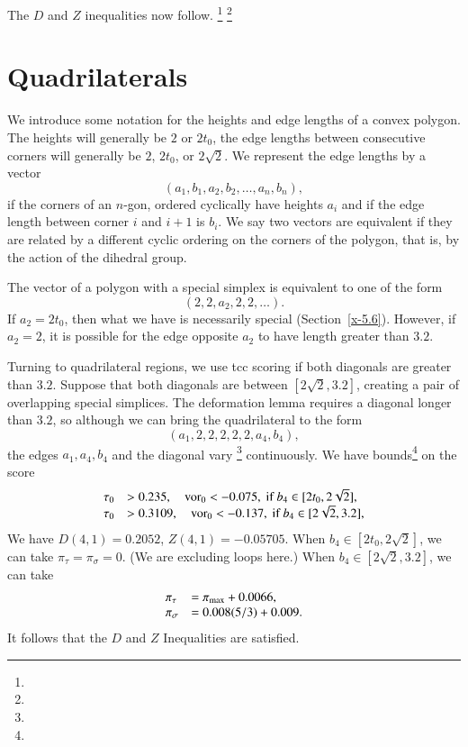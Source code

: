 The $D$ and $Z$ inequalities now follow.%
\footnote{} %
\footnote{} %

\section{Quadrilaterals} %

We introduce some notation for the heights and edge lengths of a convex
polygon.  The heights will generally be $2$ or $2t_0$, the edge lengths
between consecutive corners will generally be $2$, $2t_0$, or
$2\sqrt{2}$.  We represent the edge lengths by a vector
    $$(a_1,b_1,a_2,b_2,\ldots,a_n,b_n),$$
if the corners of an $n$-gon, ordered cyclically have heights $a_i$ and
if the edge length between corner $i$ and $i+1$ is $b_i$.  We say two
vectors are equivalent if they are related by a different cyclic
ordering on the corners of the polygon, that is, by the action of the
dihedral group.

The vector of a polygon with a special simplex is equivalent to one of
the form
    $$(2,2,a_2,2,2,\ldots).$$  If $a_2=2t_0$, then what we have is
necessarily special (Section~\ref{x-5.6}). However, if $a_2=2$, it is
possible for the edge opposite $a_2$ to have length greater than $3.2$.


Turning to quadrilateral regions, we use tcc scoring if both diagonals
are greater than $3.2$.   Suppose that both diagonals are between
$[2\sqrt{2},3.2]$, creating a pair of overlapping special simplices. The
deformation lemma requires a diagonal longer than $3.2$, so although we
can bring the quadrilateral to the form
    $$(a_1,2,2,2,2,2,a_4,b_4),$$
the edges $a_1,a_4,b_4$ and the diagonal vary%
\footnote{} %
continuously.
We have bounds\footnote{} %
 on the score
    $$
    \begin{array}{lll}
    \tau_0 &> 0.235, \quad \operatorname{vor}_0 < -0.075,
                \hbox{ if } b_4\in[2t_0,2\sqrt{2}],\\
    \tau_0 &> 0.3109, \quad \operatorname{vor}_0 < -0.137,
                \hbox{ if } b_4\in[2\sqrt{2},3.2],\\
    \end{array}
    $$
We have $D(4,1)=0.2052$, $Z(4,1)=-0.05705$. When
$b_4\in[2t_0,2\sqrt{2}]$, we can take $\pi_\tau=\pi_\sigma=0$. (We are
excluding loops here.) When $b_4\in[2\sqrt{2},3.2]$, we can take
    $$
    \begin{array}{lll}
    \pi_\tau &= \pi_{\max}+ 0.0066, \\
    \pi_\sigma &= 0.008 (5/3)+ 0.009. \\
    \end{array}
    $$
It follows that the $D$ and $Z$ Inequalities are satisfied.

